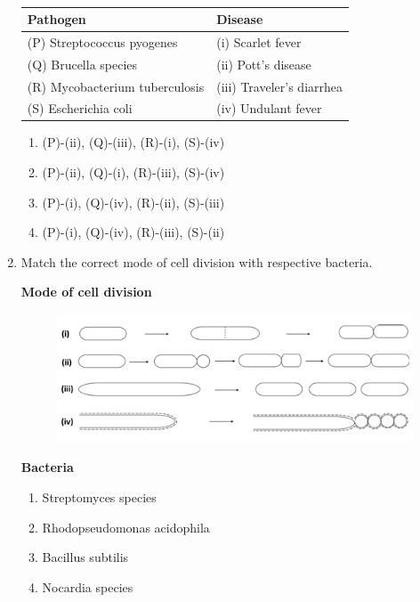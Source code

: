 \documentclass[journal,12pt,onecolumn]{IEEEtran}
\theoremstyle{remark}
\begin{document}
\begin{enumerate}
    \begin{table}[h!]
    \centering
    \caption*{}
    \label{tab:q76}
    \begin{tabular}{ll}
    \hline
    \textbf{Pathogen} & \textbf{Disease} \\
    \hline
    (P) Streptococcus pyogenes & (i) Scarlet fever \\
    (Q) Brucella species & (ii) Pott’s disease \\
    (R) Mycobacterium tuberculosis & (iii) Traveler’s diarrhea \\
    (S) Escherichia coli & (iv) Undulant fever \\
    \hline
    \end{tabular}
    \end{table}

    \begin{enumerate}
        \item (P)-(ii), (Q)-(iii), (R)-(i), (S)-(iv)
        \item (P)-(ii), (Q)-(i), (R)-(iii), (S)-(iv)
        \item (P)-(i), (Q)-(iv), (R)-(ii), (S)-(iii)
        \item (P)-(i), (Q)-(iv), (R)-(iii), (S)-(ii)
    \end{enumerate}

    \item Match the correct mode of cell division with respective bacteria.

    \hfill{}
 \textbf{Mode of cell division}   
    \begin{figure}[h!]
        \centering
        \includegraphics[width=0.8\columnwidth]{fig23.png}
        \caption*{}
        \label{fig:q77}
    \end{figure}

    \textbf{Bacteria}
\begin{enumerate}[label=\textbf{\Alph*}),start=16]
  \item Streptomyces species 
  \item  Rhodopseudomonas acidophila 
  \item  Bacillus subtilis 
  \item  Nocardia species
    \end{enumerate}


\end{enumerate}
\end{document}
